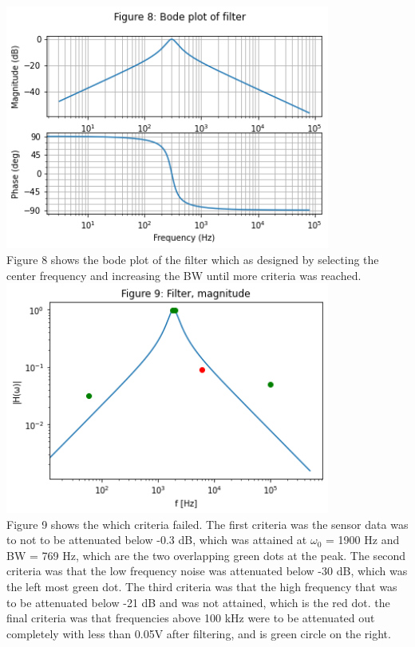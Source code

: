 \documentclass[12pt,a4paper]{article}
\begin{document}
\includegraphics[width=0.8\textwidth]{Figure 8.png}\\
Figure 8 shows the bode plot of the filter which as designed by selecting the center frequency and increasing the BW until more criteria was reached.\\


\includegraphics[width=0.8\textwidth]{Figure 9.png}\\
Figure 9 shows the which criteria failed. The first criteria was the sensor data was to not to be attenuated below -0.3 dB, which was attained at $\omega_0$ = 1900 Hz and BW = 769 Hz, which are the two overlapping green dots at the peak. The second criteria was that the low frequency noise was attenuated below -30 dB, which was the left most green dot. The third criteria was that the high frequency that was to be attenuated below -21 dB and was not attained, which is the red dot. the final criteria was that frequencies above 100 kHz were to be attenuated out completely with less than 0.05V after filtering, and is green circle on the right.\\
\end{document}
